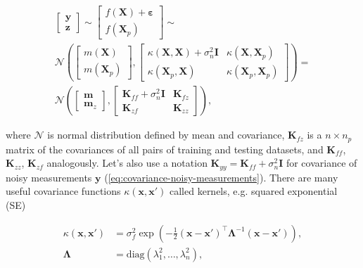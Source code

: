 \documentclass{ifacconf}
\begin{document}
\begin{multline*}
\left[\begin{array}{c}
\mathbf{y}\\
\mathbf{z}
\end{array}\right]\sim\left[\begin{array}{c}
f(\mathbf{X})+\boldsymbol{\varepsilon}\\
f(\mathbf{X}_{p})
\end{array}\right]\sim\\
\mathcal{N}\left(\left[\begin{array}{c}
m(\mathbf{X})\\
m(\mathbf{X}_{p})
\end{array}\right],\left[\begin{array}{cc}
\kappa(\mathbf{X},\mathbf{X})+\sigma_{n}^{2}\mathbf{I} & \kappa(\mathbf{X},\mathbf{X}_{p})\\
\kappa(\mathbf{X}_{p},\mathbf{X}) & \kappa(\mathbf{X}_{p},\mathbf{X}_{p})
\end{array}\right]\right)=\\
\mathcal{N}\left(\left[\begin{array}{c}
\mathbf{m}\\
\mathbf{m}_{z}
\end{array}\right],\left[\begin{array}{cc}
\mathbf{K}_{ff}+\sigma_{n}^{2}\mathbf{I} & \mathbf{K}_{fz}\\
\mathbf{K}_{zf} & \mathbf{K}_{zz}
\end{array}\right]\right),
\end{multline*}

\noindent where $\mathcal{N}$ is normal distribution defined by
mean and covariance, $\mathbf{K}_{fz}$ is a $n\times n_{p}$ matrix
of the covariances of all pairs of training and testing datasets,
and $\mathbf{K}_{ff}$, $\mathbf{K}_{zz}$, $\mathbf{K}_{zf}$ analogously.
Let's also use a notation $\mathbf{K}_{yy}=\mathbf{K}_{ff}+\sigma_{n}^{2}\mathbf{I}$
for covariance of noisy measurements $\mathbf{y}$ (\ref{eq:covariance-noisy-measurements}).
There are many useful covariance functions $\kappa(\mathbf{x},\mathbf{x}')$
called kernels, e.g. squared exponential (SE)

\begin{align*}
\kappa(\mathbf{x},\mathbf{x}') & =\sigma_{f}^{2}\exp\left(-\frac{1}{2}\left(\mathbf{x}-\mathbf{x}'\right)^{\top}\mathbf{\Lambda}^{-1}\left(\mathbf{x}-\mathbf{x}'\right)\right),\\
\mathbf{\Lambda} & =\mathrm{diag}(\lambda_{1}^{2},\ldots,\lambda_{n}^{2}),
\end{align*}
\end{document}

